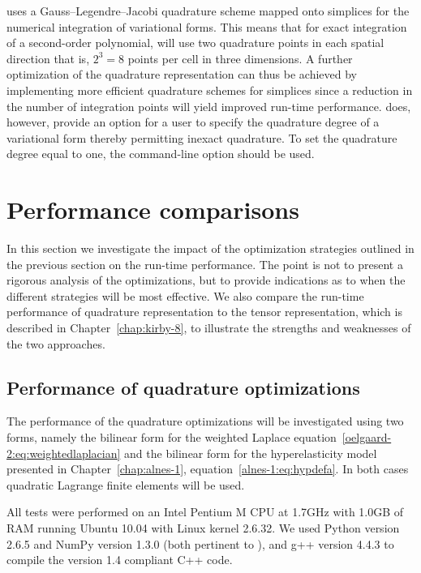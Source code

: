 \ffc{} uses a Gauss--Legendre--Jacobi quadrature scheme mapped onto
simplices for the numerical integration of variational forms.  This
means that for exact integration of a second-order polynomial, \ffc{}
will use two quadrature points in each spatial direction that is, $2^3
= 8$ points per cell in three dimensions.  A further optimization of
the quadrature representation can thus be achieved by implementing
more efficient quadrature schemes for simplices since a reduction in
the number of integration points will yield improved run-time
performance.  \ffc{} does, however, provide an option for a user to
specify the quadrature degree of a variational form thereby permitting
inexact quadrature.  To set the quadrature degree equal to one, the
command-line option  should be used.

\section{Performance comparisons}

In this section we investigate the impact of the optimization
strategies outlined in the previous section on the run-time
performance. The point is not to present a rigorous analysis of the
optimizations, but to provide indications as to when the different
strategies will be most effective. We also compare the run-time
performance of quadrature representation to the tensor representation,
which is described in Chapter~\ref{chap:kirby-8}, to illustrate the
strengths and weaknesses of the two approaches.

\subsection{Performance of quadrature optimizations}
\label{oelgaard-2:sec:quad_performance}

The performance of the quadrature optimizations will be investigated
using two forms, namely the bilinear form for the weighted Laplace
equation~\eqref{oelgaard-2:eq:weightedlaplacian} and the bilinear form
for the hyperelasticity model presented in Chapter~\ref{chap:alnes-1},
equation~\eqref{alnes-1:eq:hypdefa}.  In both cases quadratic Lagrange
finite elements will be used.

All tests were performed on an Intel Pentium M CPU at 1.7GHz with
1.0GB of RAM running Ubuntu 10.04 with Linux kernel 2.6.32.  We used
Python version 2.6.5 and NumPy version 1.3.0 (both pertinent to
\ffc{}), and g++ version 4.4.3 to compile the \ufc{} version 1.4
compliant C++ code.

